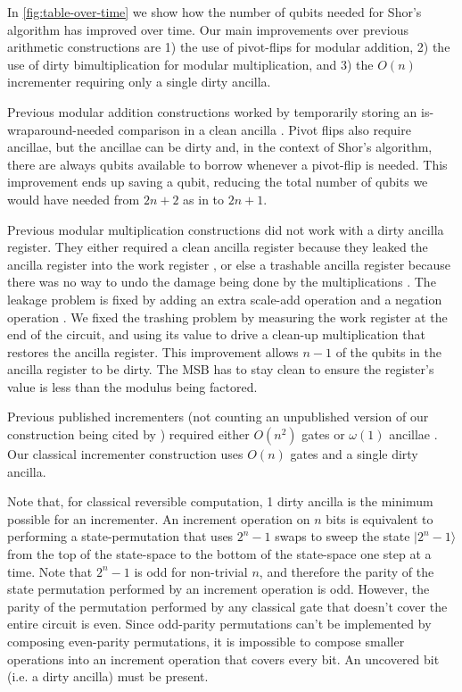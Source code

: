 \documentclass[twocolumn,longbibliography]{quantumarticle-customized}
\begin{document}
In \autoref{fig:table-over-time} we show how the number of qubits needed for Shor's algorithm has improved over time.
Our main improvements over previous arithmetic constructions are 1) the use of pivot-flips for modular addition, 2) the use of dirty bimultiplication for modular multiplication, and 3) the $O(n)$ incrementer requiring only a single dirty ancilla.

Previous modular addition constructions worked by temporarily storing an is-wraparound-needed comparison in a clean ancilla \cite{takahashi2006, haner2016}.
Pivot flips also require ancillae, but the ancillae can be dirty and, in the context of Shor's algorithm, there are always qubits available to borrow whenever a pivot-flip is needed.
This improvement ends up saving a qubit, reducing the total number of qubits we would have needed from $2n+2$ as in \cite{haner2016} to $2n+1$.

Previous modular multiplication constructions did not work with a dirty ancilla register.
They either required a clean ancilla register because they leaked the ancilla register into the work register \cite{haner2016}, or else a trashable ancilla register because there was no way to undo the damage being done by the multiplications \cite{zalka2006}.
The leakage problem is fixed by adding an extra scale-add operation and a negation operation \cite{zalka2006}.
We fixed the trashing problem by measuring the work register at the end of the circuit, and using its value to drive a clean-up multiplication that restores the ancilla register.
This improvement allows $n-1$ of the qubits in the ancilla register to be dirty.
The MSB has to stay clean to ensure the register's value is less than the modulus being factored.

Previous published incrementers (not counting an unpublished version of our construction being cited by \cite{haner2016}) required either $O(n^2)$ gates or $\omega(1)$ ancillae \cite{draper2000, barenco1995}.
Our classical incrementer construction uses $O(n)$ gates and a single dirty ancilla.

Note that, for classical reversible computation, 1 dirty ancilla is the minimum possible for an incrementer.
An increment operation on $n$ bits is equivalent to performing a state-permutation that uses $2^n-1$ swaps to sweep the state $|2^n-1\rangle$ from the top of the state-space to the bottom of the state-space one step at a time.
Note that $2^n-1$ is odd for non-trivial $n$, and therefore the parity of the state permutation performed by an increment operation is odd.
However, the parity of the permutation performed by any classical gate that doesn't cover the entire circuit is even.
Since odd-parity permutations can't be implemented by composing even-parity permutations, it is impossible to compose smaller operations into an increment operation that covers every bit.
An uncovered bit (i.e. a dirty ancilla) must be present.
\end{document}
